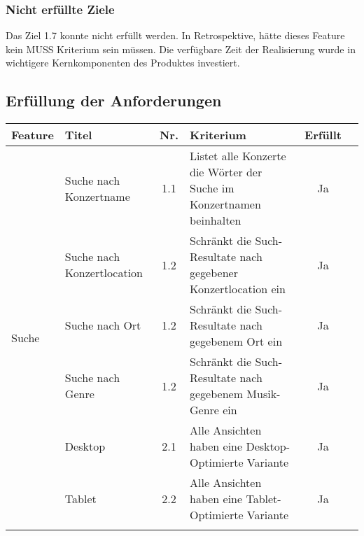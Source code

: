\subsubsection{Nicht erfüllte Ziele}

Das Ziel 1.7 konnte nicht erfüllt werden. In Retrospektive, hätte dieses
Feature kein MUSS Kriterium sein müssen. Die verfügbare Zeit der Realisierung
wurde in wichtigere Kernkomponenten des Produktes investiert.

\clearpage
\subsection{Erfüllung der Anforderungen}

\begin{longtable}[]{@{}p{1.9cm}p{2.5cm}cp{5.5cm}cc@{}}
  \toprule
  \textbf{Feature}           & \textbf{Titel}             & \textbf{Nr.} & \textbf{Kriterium}                                                                                          & \textbf{Erfüllt}\tabularnewline
  \midrule
  \endhead
  \multirow{10}{*}{Suche}    & Suche nach Konzertname     & 1.1          & Listet alle Konzerte die Wörter der Suche im Konzertnamen beinhalten                                        & Ja                              \\ \cline{2-6}
                             & Suche nach Konzertlocation & 1.2          & Schränkt die Such-Resultate nach gegebener Konzertlocation ein                                              & Ja                              \\ \cline{2-6}
                             & Suche nach Ort             & 1.2          & Schränkt die Such-Resultate nach gegebenem Ort ein                                                          & Ja                              \\ \cline{2-6}
                             & Suche nach Genre           & 1.2          & Schränkt die Such-Resultate nach gegebenem Musik-Genre ein                                                  & Ja                              \\
  \midrule
  \multirow{8}{*}{Design}    & Desktop                    & 2.1          & Alle Ansichten haben eine Desktop-Optimierte Variante                                                       & Ja                              \\ \cline{2-6}
                             & Tablet                     & 2.2          & Alle Ansichten haben eine Tablet-Optimierte Variante                                                        & Ja                              \\ \cline{2-6}

\end{longtable}
